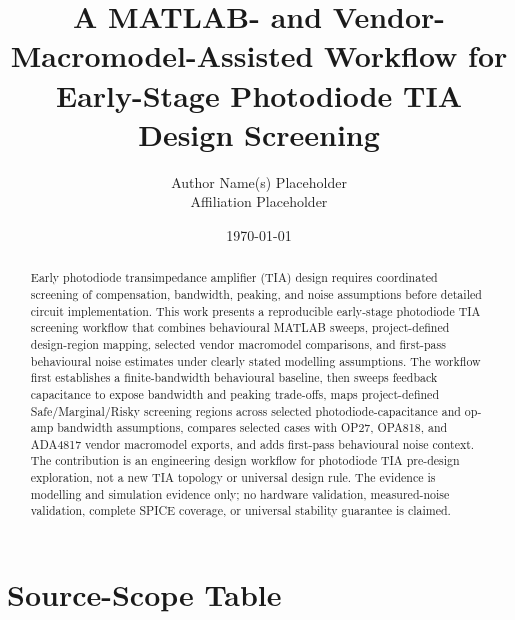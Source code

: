 \documentclass[11pt]{article}
\title{A MATLAB- and Vendor-Macromodel-Assisted Workflow for Early-Stage Photodiode TIA Design Screening}
\author{Author Name(s) Placeholder\\Affiliation Placeholder}
\date{\today}
\begin{document}
\maketitle

\begin{abstract}
Early photodiode transimpedance amplifier (TIA) design requires coordinated screening of compensation, bandwidth, peaking, and noise assumptions before detailed circuit implementation. This work presents a reproducible early-stage photodiode TIA screening workflow that combines behavioural MATLAB sweeps, project-defined design-region mapping, selected vendor macromodel comparisons, and first-pass behavioural noise estimates under clearly stated modelling assumptions. The workflow first establishes a finite-bandwidth behavioural baseline, then sweeps feedback capacitance to expose bandwidth and peaking trade-offs, maps project-defined Safe/Marginal/Risky screening regions across selected photodiode-capacitance and op-amp bandwidth assumptions, compares selected cases with OP27, OPA818, and ADA4817 vendor macromodel exports, and adds first-pass behavioural noise context. The contribution is an engineering design workflow for photodiode TIA pre-design exploration, not a new TIA topology or universal design rule. The evidence is modelling and simulation evidence only; no hardware validation, measured-noise validation, complete SPICE coverage, or universal stability guarantee is claimed.
\end{abstract}



\FloatBarrier

\FloatBarrier

\FloatBarrier

\FloatBarrier

\FloatBarrier

\appendix
\section{Source-Scope Table}
\SourceConfidenceTable
\FloatBarrier



\end{document}
